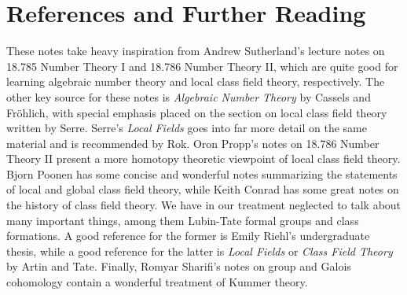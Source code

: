 \documentclass[11pt]{article}
\begin{document}
\section{References and Further Reading}
These notes take heavy inspiration from Andrew Sutherland's lecture notes on 18.785 Number Theory I and 18.786 Number Theory II, which are quite good for learning algebraic number theory and local class field theory, respectively. The other key source for these notes is \textit{Algebraic Number Theory} by Cassels and Fr\"{o}hlich, with special emphasis placed on the section on local class field theory written by Serre. Serre's \textit{Local Fields} goes into far more detail on the same material and is recommended by Rok. Oron Propp's notes on 18.786 Number Theory II present a more homotopy theoretic viewpoint of local class field theory. Bjorn Poonen has some concise and wonderful notes summarizing the statements of local and global class field theory, while Keith Conrad has some great notes on the history of class field theory. We have in our treatment neglected to talk about many important things, among them Lubin-Tate formal groups and class formations. A good reference for the former is Emily Riehl's undergraduate thesis, while a good reference for the latter is \textit{Local Fields} or \textit{Class Field Theory} by Artin and Tate. Finally, Romyar Sharifi's notes on group and Galois cohomology contain a wonderful treatment of Kummer theory.
\end{document}
